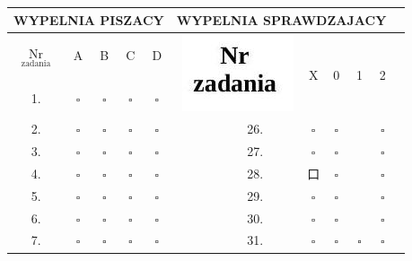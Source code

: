 \documentclass[10pt]{article}
\begin{document}
\begin{center}
\begin{tabular}{|c|c|c|c|c|c|c|c|c|c|c|c|c|}
\hline
\multicolumn{5}{|c|}{WYPELNIA PISZACY} & \multicolumn{7}{|r|}{WYPELNIA SPRAWDZAJACY} &  \\
\hline
\( \underset{\text { zadania }}{\mathrm{Nr}} \) & A & B & C & D & \multicolumn{2}{|r|}{\multirow[b]{2}{*}{\includegraphics[max width=\textwidth]{2024_11_21_87037534e5fdc524263ag-16}
}} & \multirow[b]{2}{*}{X} & \multirow[b]{2}{*}{0} & \multicolumn{2}{|c|}{\multirow[b]{2}{*}{1}} & \multirow[b]{2}{*}{2} &  \\
\hline
1. & \(\square\) & \(\square\) & \(\square\) & \(\square\) &  &  &  &  &  &  &  &  \\
\hline
2. & \(\square\) & \(\square\) & \(\square\) & \(\square\) &  & 26. & \(\square\) & \(\square\) &  &  & \(\square\) &  \\
\hline
3. & \(\square\) & \(\square\) & \(\square\) & \(\square\) &  & 27. & \(\square\) & \(\square\) &  &  & \(\square\) &  \\
\hline
4. & \(\square\) & \(\square\) & \(\square\) & \(\square\) &  & 28. & 口 & \(\square\) &  &  & \(\square\) &  \\
\hline
5. & \(\square\) & \(\square\) & \(\square\) & \(\square\) &  & 29. & \(\square\) & \(\square\) &  &  & \(\square\) &  \\
\hline
6. & \(\square\) & \(\square\) & \(\square\) & \(\square\) &  & 30. & \(\square\) & \(\square\) &  &  & \(\square\) &  \\
\hline
7. & \(\square\) & \(\square\) & \(\square\) & \(\square\) &  & \multirow[t]{2}{*}{31.} & \(\square\) & \(\square\) & \multicolumn{2}{|c|}{\multirow[t]{2}{*}{\(\square\)}} & \multirow[t]{2}{*}{\(\square\)} &  \\

\end{tabular}
\end{center}
\end{document}

